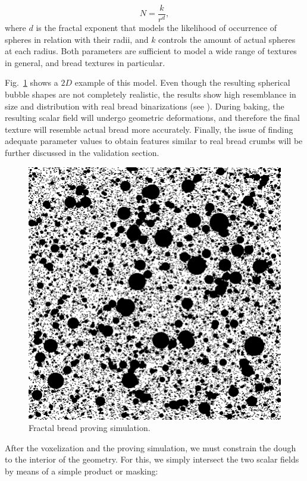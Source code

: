 \documentclass[spanish,a4paper,11pt,oneside,links]{report}
\begin{document}
\begin{equation*}
N = \frac{k}{r^{d}},
\end{equation*}
where $d$ is the fractal exponent that models the likelihood of occurrence of spheres in relation with their radii, and $k$ controls the amount of actual spheres at each radius. 
Both parameters are sufficient to model a wide range of textures in general, and bread textures in particular.

Fig.~\ref{FigProving} shows a $2D$ example of this model.
Even though the resulting spherical bubble shapes are not completely realistic, the results show high resemblance in size and distribution with real bread binarizations (see \cite{Babin2006}).
During baking, the resulting scalar field will undergo geometric deformations, and therefore the final texture will resemble actual bread more accurately.
Finally, the issue of finding adequate parameter values to obtain features similar to real bread crumbs will be further discussed in the validation section.

\begin{figure}
\includegraphics[scale=0.28]{figures/bubbles}
\caption{Fractal bread proving simulation.}
\label{FigProving}
\end{figure}

After the voxelization and the proving simulation, we must constrain the dough to the interior of the geometry. 
For this, we simply intersect the two scalar fields by means of a simple product or masking:
\end{document}
